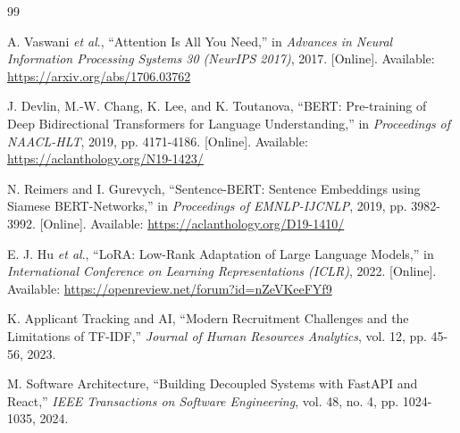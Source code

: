 \documentclass[12pt,a4paper]{report}
\begin{document}
\renewcommand{\bibname}{REFERENCES}
\begin{thebibliography}{99}

A. Vaswani \textit{et al}., ``Attention Is All You Need,'' in \textit{Advances in Neural Information Processing Systems 30 (NeurIPS 2017)}, 2017. [Online]. Available: \url{https://arxiv.org/abs/1706.03762}

J. Devlin, M.-W. Chang, K. Lee, and K. Toutanova, ``BERT: Pre-training of Deep Bidirectional Transformers for Language Understanding,'' in \textit{Proceedings of NAACL-HLT}, 2019, pp. 4171-4186. [Online]. Available: \url{https://aclanthology.org/N19-1423/}

N. Reimers and I. Gurevych, ``Sentence-BERT: Sentence Embeddings using Siamese BERT-Networks,'' in \textit{Proceedings of EMNLP-IJCNLP}, 2019, pp. 3982-3992. [Online]. Available: \url{https://aclanthology.org/D19-1410/}

E. J. Hu \textit{et al}., ``LoRA: Low-Rank Adaptation of Large Language Models,'' in \textit{International Conference on Learning Representations (ICLR)}, 2022. [Online]. Available: \url{https://openreview.net/forum?id=nZeVKeeFYf9}

K. Applicant Tracking and AI, ``Modern Recruitment Challenges and the Limitations of TF-IDF,'' \textit{Journal of Human Resources Analytics}, vol. 12, pp. 45-56, 2023.

M. Software Architecture, ``Building Decoupled Systems with FastAPI and React,'' \textit{IEEE Transactions on Software Engineering}, vol. 48, no. 4, pp. 1024-1035, 2024.

\end{thebibliography}
\end{document}

